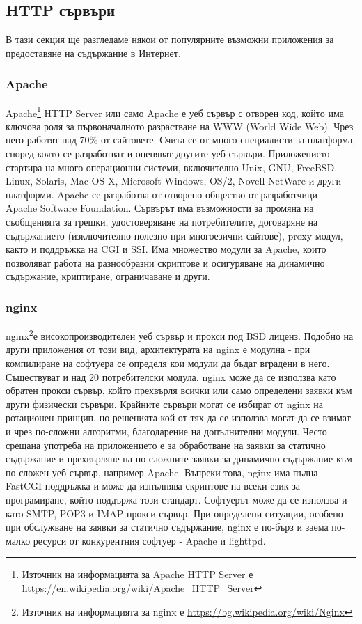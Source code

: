 \documentclass[pdftex,12pt,a4paper]{report}
\begin{document}
\subsection {HTTP сървъри}
В тази секция ще разгледаме някои от популярните възможни приложения за предоставяне на съдържание в Интернет.
\subsubsection {Apache}
Apache\footnote{Източник на информацията за Apache HTTP Server е \url{https://en.wikipedia.org/wiki/Apache_HTTP_Server}} HTTP Server или само Apache е уеб сървър с отворен код, който има ключова роля за първоначалното разрастване на WWW (World Wide Web). Чрез него работят над 70\% от сайтовете. Счита се от много специалисти за платформа, според която се разработват и оценяват другите уеб сървъри.
Приложението стартира на много операционни системи, включително Unix, GNU, FreeBSD, Linux, Solaris, Mac OS X, Microsoft Windows, OS/2, Novell NetWare и други платформи.
Apache се разработва от отворено общество от разработчици - Apache Software Foundation. Сървърът има възможности за промяна на съобщенията за грешки, удостоверяване на потребителите, договаряне на съдържанието (изключително полезно при многоезични сайтове), proxy модул, както и поддръжка на CGI и SSI. Има множество модули за Apache, които позволяват работа на разнообразни скриптове и осигуряване на динамично съдържание, криптиране, ограничаване и други.
\subsubsection {nginx}
nginx\footnote{Източник на информацията за nginx е \url{https://bg.wikipedia.org/wiki/Nginx}}е високопроизводителен уеб сървър и прокси под BSD лиценз. Подобно на други приложения от този вид, архитектурата на nginx е модулна - при компилиране на софтуера се определя кои модули да бъдат вградени в него. Съществуват и над 20 потребителски модула.
nginx може да се използва като обратен прокси сървър, който прехвърля всички или само определени заявки към други физически сървъри. Крайните сървъри могат се избират от nginx на ротационен принцип, но решенията кой от тях да се използва могат да се взимат и чрез по-сложни алгоритми, благодарение на допълнителни модули. Често срещана употреба на приложението е за обработване на заявки за статично съдържание и прехвърляне на по-сложните заявки за динамично съдържание към по-сложен уеб сървър, например Apache. Въпреки това, nginx има пълна FastCGI поддръжка и може да изпълнява скриптове на всеки език за програмиране, който поддържа този стандарт. Софтуерът може да се използва и като SMTP, POP3 и IMAP прокси сървър.
При определени ситуации, особено при обслужване на заявки за статично съдържание, nginx е по-бърз и заема по-малко ресурси от конкурентния софтуер - Apache и lighttpd.
\end{document}
